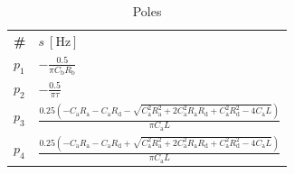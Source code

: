 \begin{table}[h]
\centering
\begin{tabular}[c]{ll}
\textbf{\#} & \textbf{$s\ [\mathrm{Hz}]$} \\ 
\rowcolor{myyellow}
$p_{1}$ &$- \frac{0.5}{\pi C_{\mathrm{b}} R_{\mathrm{b}}}$ \\ 
$p_{2}$ &$- \frac{0.5}{\pi \tau}$ \\ 
\rowcolor{myyellow}
$p_{3}$ &$\frac{0.25 \left(- C_{\mathrm{a}} R_{\mathrm{a}} - C_{\mathrm{a}} R_{\mathrm{d}} - \sqrt{C_{\mathrm{a}}^{2} R_{\mathrm{a}}^{2} + 2 C_{\mathrm{a}}^{2} R_{\mathrm{a}} R_{\mathrm{d}} + C_{\mathrm{a}}^{2} R_{\mathrm{d}}^{2} - 4 C_{\mathrm{a}} L}\right)}{\pi C_{\mathrm{a}} L}$ \\ 
$p_{4}$ &$\frac{0.25 \left(- C_{\mathrm{a}} R_{\mathrm{a}} - C_{\mathrm{a}} R_{\mathrm{d}} + \sqrt{C_{\mathrm{a}}^{2} R_{\mathrm{a}}^{2} + 2 C_{\mathrm{a}}^{2} R_{\mathrm{a}} R_{\mathrm{d}} + C_{\mathrm{a}}^{2} R_{\mathrm{d}}^{2} - 4 C_{\mathrm{a}} L}\right)}{\pi C_{\mathrm{a}} L}$ \\ 
\end{tabular}
\caption{Poles}
\end{table}

